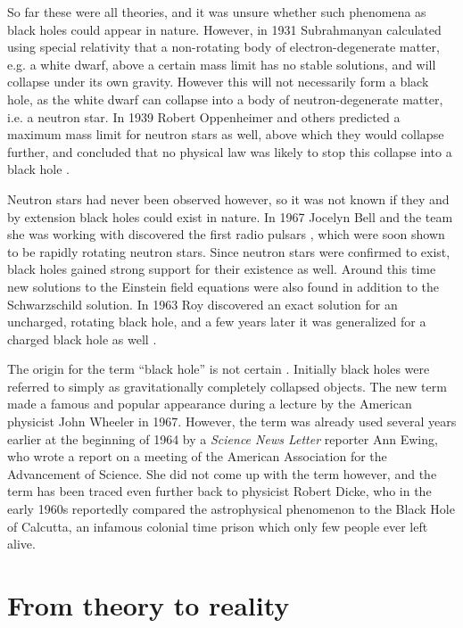\documentclass[english, oneside]{HYgradu}
\begin{document}
So far these were all theories, and it was unsure whether such phenomena as black holes could appear in nature. However, in 1931 Subrahmanyan \citeauthor{chandrasekhar:1931} calculated using special relativity that a non-rotating body of electron-degenerate matter, e.g. a white dwarf, above a certain mass limit has no stable solutions, and will collapse under its own gravity. However this will not necessarily form a black hole, as the white dwarf can collapse into a body of neutron-degenerate matter, i.e. a neutron star. In 1939 Robert Oppenheimer and others predicted a maximum mass limit for neutron stars as well, above which they would collapse further, and concluded that no physical law was likely to stop this collapse into a black hole \citep{oppenheimer:1939}.

Neutron stars had never been observed however, so it was not known if they and by extension black holes could exist in nature. In 1967 Jocelyn Bell and the team she was working with discovered the first radio pulsars \citep{hewish-bell:1968}, which were soon shown to be rapidly rotating neutron stars. Since neutron stars were confirmed to exist, black holes gained strong support for their existence as well. Around this time new solutions to the Einstein field equations were also found in addition to the Schwarzschild solution. In 1963 Roy \citeauthor{kerr:1963} discovered an exact solution for an uncharged, rotating black hole, and a few years later it was generalized for a charged black hole as well \citep{newman:1965}.

The origin for the term ``black hole'' is not certain \citep{blackholeorigins}. Initially black holes were referred to simply as gravitationally completely collapsed objects. The new term made a famous and popular appearance during a lecture by the American physicist John Wheeler in 1967. However, the term was already used several years earlier at the beginning of 1964 by a \textit{Science News Letter} reporter Ann Ewing, who wrote a report on a meeting of the American Association for the Advancement of Science. She did not come up with the term however, and the term has been traced even further back to physicist Robert Dicke, who in the early 1960s reportedly compared the astrophysical phenomenon to the Black Hole of Calcutta, an infamous colonial time prison which only few people ever left alive.

\section{From theory to reality}
\end{document}
